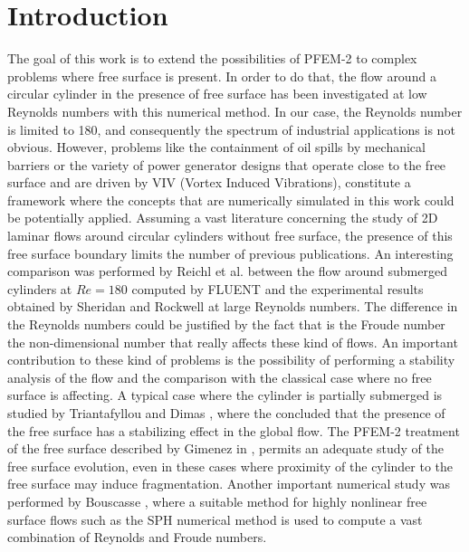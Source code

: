 \documentclass[a4paper,conference]{IEEEtran}
\begin{document}
\section{Introduction}

The goal of this work is to extend the possibilities of PFEM-2 to complex problems where free surface is present. In order to do that, the flow around a circular cylinder in the presence of free surface has been investigated at low Reynolds numbers with this numerical method. In our case, the Reynolds number is limited to 180, and consequently the spectrum of industrial applications is not obvious. However, problems like the containment of oil spills by mechanical barriers \cite{Amini20081479} or the variety of power generator designs that operate close to the free surface and are driven by VIV (Vortex Induced Vibrations), constitute a framework where the concepts that are numerically simulated in this work could be potentially applied. Assuming a vast literature concerning the study of 2D laminar flows around circular cylinders without free surface, the presence of this free surface boundary limits the number of previous publications. An interesting comparison was performed by Reichl et al. \cite{Reichl05} between the flow around submerged cylinders at $Re=180$ computed by FLUENT and the experimental results obtained by Sheridan and Rockwell \cite{sheridan_etal_pof1995_metastable_cylinder_fs,SHERIDAN_ROCKWELL_JFM1997} at large Reynolds numbers. The difference in the Reynolds numbers could be justified by the fact that is the Froude number the non-dimensional number that really affects these kind of flows. An important contribution to these kind of problems is the possibility of performing a stability analysis of the flow and the comparison with the classical case where no free surface is affecting. A typical case where the cylinder is partially submerged is studied by Triantafyllou and Dimas \cite{Dimas89}, where the concluded that the presence of the free surface has a stabilizing effect in the global flow. The PFEM-2 treatment of the free surface described by Gimenez in \cite{Gimenez2015186}, permits an adequate study of the free surface evolution, even in these cases where proximity of the cylinder to the free surface may induce fragmentation. Another important numerical study was performed by Bouscasse \cite{Bouscasse14}, where a suitable method for highly nonlinear free surface flows such as the SPH numerical method \cite{Mon77} is used to compute a vast combination of Reynolds and Froude numbers.
\end{document}
